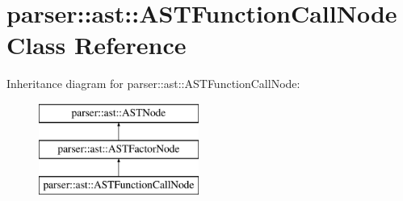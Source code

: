 \hypertarget{classparser_1_1ast_1_1ASTFunctionCallNode}{}\section{parser\+:\+:ast\+:\+:A\+S\+T\+Function\+Call\+Node Class Reference}
\label{classparser_1_1ast_1_1ASTFunctionCallNode}
Inheritance diagram for parser\+:\+:ast\+:\+:A\+S\+T\+Function\+Call\+Node\+:\begin{figure}[H]
\begin{center}
\leavevmode
\includegraphics[height=3.000000cm]{de/d41/classparser_1_1ast_1_1ASTFunctionCallNode}
\end{center}
\end{figure}
